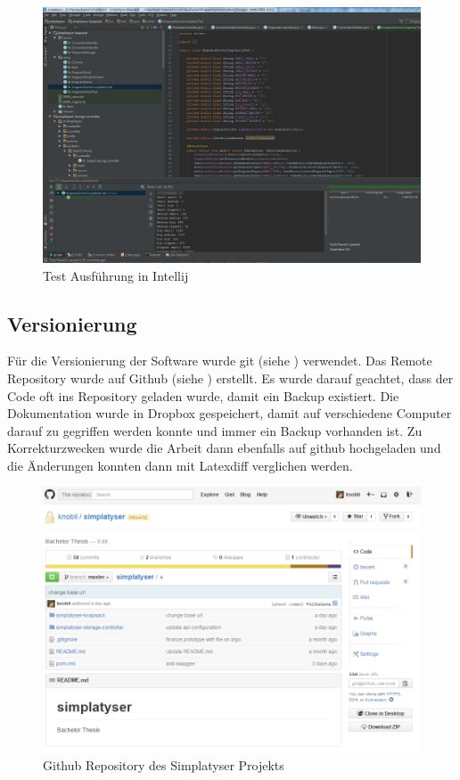 \begin{figure}[h]
\centering
\includegraphics[scale=0.4]{images/intellij.png}
\caption[Test Ausführung in Intellij]{Test Ausführung in Intellij \selfmade{}}
\label{fig:intellij}
\end{figure}

\subsection{Versionierung}
Für die Versionierung der Software wurde git (siehe \cite{git}) verwendet. Das Remote Repository wurde auf Github (siehe \cite{github_simplatyzer}) erstellt. Es wurde darauf geachtet, dass 
der Code oft ins Repository geladen wurde, damit ein Backup existiert. Die Dokumentation wurde in Dropbox gespeichert, damit auf verschiedene Computer darauf zu gegriffen werden konnte 
und immer ein Backup vorhanden ist. Zu Korrekturzwecken wurde die Arbeit dann ebenfalls auf github hochgeladen und die Änderungen konnten dann mit Latexdiff verglichen werden.

\begin{figure}[h]
\centering
\includegraphics[scale=0.5]{images/github.png}
\caption[Github Repository des Simplatyser Projekts]{Github Repository des Simplatyser Projekts \selfmade{}}
\label{fig:github_repo}
\end{figure}

